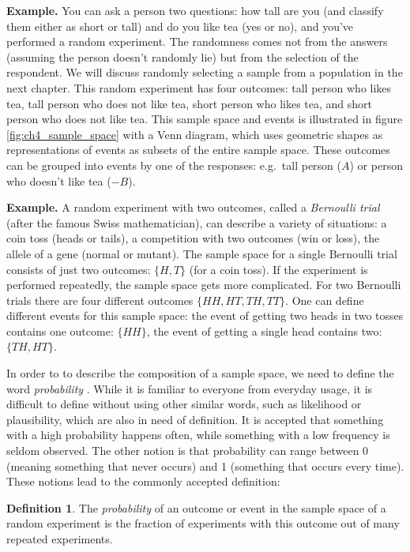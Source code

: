 \documentclass[
]{book}
\theoremstyle{definition}
\newtheorem{definition}{Definition}[chapter]
\theoremstyle{definition}
\theoremstyle{definition}
\theoremstyle{remark}
\begin{document}
\textbf{Example.} You can ask a person two questions: how tall are you (and classify them either as short or tall) and do you like tea (yes or no), and you've performed a random experiment. The randomness comes not from the answers (assuming the person doesn't randomly lie) but from the selection of the respondent. We will discuss randomly selecting a sample from a population in the next chapter. This random experiment has four outcomes: tall person who likes tea, tall person who does not like tea, short person who likes tea, and short person who does not like tea. This sample space and events is illustrated in figure \ref{fig:ch4_sample_space} with a Venn diagram, which uses geometric shapes as representations of events as subsets of the entire sample space. These outcomes can be grouped into events by one of the responses: e.g.~tall person (\(A\)) or person who doesn't like tea (\(-B\)).

\textbf{Example.} A random experiment with two outcomes, called a \emph{Bernoulli trial} (after the famous Swiss mathematician), can describe a variety of situations: a coin toss (heads or tails), a competition with two outcomes (win or loss), the allele of a gene (normal or mutant). The sample space for a single Bernoulli trial consists of just two outcomes: \(\{H,T\}\) (for a coin toss). If the experiment is performed repeatedly, the sample space gets more complicated. For two Bernoulli trials there are four different outcomes \(\{HH, HT, TH, TT \}\). One can define different events for this sample space: the event of getting two heads in two tosses contains one outcome: \(\{HH\}\), the event of getting a single head contains two: \(\{TH, HT\}\).

In order to to describe the composition of a sample space, we need to define the word \emph{probability} \citep{feller_introduction_????}. While it is familiar to everyone from everyday usage, it is difficult to define without using other similar words, such as likelihood or plausibility, which are also in need of definition. It is accepted that something with a high probability happens often, while something with a low frequency is seldom observed. The other notion is that probability can range between 0 (meaning something that never occurs) and 1 (something that occurs every time). These notions lead to the commonly accepted definition:

\begin{definition}
\protect\hypertarget{def:def-prob-freq}{}{\label{def:def-prob-freq} }The \emph{probability} of an outcome or event in the sample space of a random experiment is the fraction of experiments with this outcome out of many repeated experiments.
\end{definition}
\end{document}
